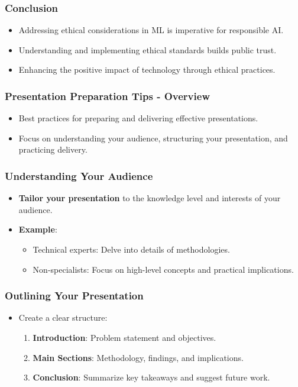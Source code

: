 \documentclass[aspectratio=169]{beamer}
\begin{document}
\begin{frame}[fragile]
    \frametitle{Conclusion}
    \begin{itemize}
        \item Addressing ethical considerations in ML is imperative for responsible AI.
        \item Understanding and implementing ethical standards builds public trust.
        \item Enhancing the positive impact of technology through ethical practices.
    \end{itemize}
\end{frame}

\begin{frame}[fragile]
    \frametitle{Presentation Preparation Tips - Overview}
    \begin{itemize}
        \item Best practices for preparing and delivering effective presentations.
        \item Focus on understanding your audience, structuring your presentation, and practicing delivery.
    \end{itemize}
\end{frame}

\begin{frame}[fragile]
    \frametitle{Understanding Your Audience}
    \begin{itemize}
        \item \textbf{Tailor your presentation} to the knowledge level and interests of your audience.
        \item \textbf{Example}: 
            \begin{itemize}
                \item Technical experts: Delve into details of methodologies.
                \item Non-specialists: Focus on high-level concepts and practical implications.
            \end{itemize}
    \end{itemize}
\end{frame}

\begin{frame}[fragile]
    \frametitle{Outlining Your Presentation}
    \begin{itemize}
        \item Create a clear structure:
            \begin{enumerate}
                \item \textbf{Introduction}: Problem statement and objectives.
                \item \textbf{Main Sections}: Methodology, findings, and implications.
                \item \textbf{Conclusion}: Summarize key takeaways and suggest future work.
            \end{enumerate}
    \end{itemize}
\end{frame}
\end{document}
